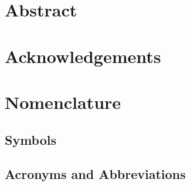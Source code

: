 
\chapter*{Abstract}

 \newpage
 
 \chapter*{Acknowledgements}
 

 \newpage


 \setcounter{tocdepth}{2}
 \tableofcontents

 \newpage


\chapter*{Nomenclature}\label{chap:symbole}

\section*{Symbols}


\section*{Acronyms and Abbreviations}



 \newpage


